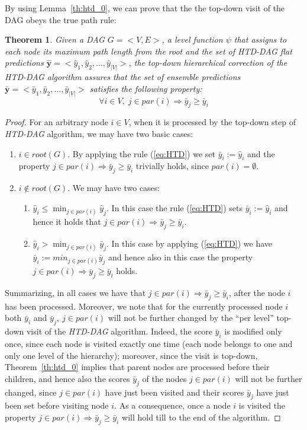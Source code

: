 \documentclass{bioinfo}
\newcommand{\by}{\boldsymbol{y}}
\newtheorem{theorem}{Theorem}
\begin{document}
By using Lemma~\ref{th:htd_0}, we can prove that the the top-down visit of the DAG obeys the true path rule:
\begin{theorem} 
Given a DAG $G = <V,E>$, a level function $\psi$ that assigns to each node its maximum path length from the root and the set of {\em HTD-DAG} flat predictions $\hat{\by} = < \hat{y}_1, \hat{y}_2, \ldots, \hat{y}_{|V|}>$, the top-down hierarchical correction of the {\em HTD-DAG} algorithm assures that the set of ensemble predictions $\bar{\by} =< \bar{y}_1, \bar{y}_2, \ldots, \bar{y}_{|V|}>$ satisfies the following property: 
\[
\forall i \in V, \;  j \in par(i) \Rightarrow \bar{y}_j \geq \bar{y}_i
\]
\label{th:htd}
\end{theorem}
\begin{proof}
For an arbitrary node $i \in V$, when it is processed by the top-down step of {\em HTD-DAG} algorithm,  we may have two basic cases:
\begin{enumerate}
\item $i \in root(G)$.
By applying the rule (\ref{eq:HTD}) we set $\bar{y}_i := \hat{y}_i$ and the property  $j \in par(i) \Rightarrow \bar{y}_j \geq \bar{y}_i$ trivially holds, since $par(i) = \emptyset$.
\item $i \notin root(G)$.
We may have two cases:
\begin{enumerate}
\item $\hat{y}_i \leq \min_{j \in par(i)} \hat{y}_j$.
In this case the rule (\ref{eq:HTD})  sets $\bar{y}_i := \hat{y}_i$ and hence it holds that $j \in par(i) \Rightarrow \bar{y}_j \geq \bar{y}_i$.
\item  $\hat{y}_i > \min_{j \in par(i)} \bar{y}_j$. 
In this case by applying (\ref{eq:HTD}) we have $\bar{y}_i := min_{j \in par(i)} \bar{y}_j$ and hence also in this case the property $j \in par(i) \Rightarrow \bar{y}_j \geq \bar{y}_i$ holds.
\end{enumerate}
\end{enumerate}
Summarizing, in all cases we have that $j \in par(i) \Rightarrow \bar{y}_j \geq \bar{y}_i$, after the node $i$ has been processed.
Moreover, we note that for the currently processed node $i$ both $\bar{y}_i$ and $\bar{y}_j,\ j \in par(i)$ will not be  further changed by the ``per level'' top-down visit of the {\em HTD-DAG} algorithm.
Indeed, the score $\bar{y}_i$ is modified only once, since each node is visited exactly one time (each node belongs to one and only one level of the hierarchy); moreover,  since the visit is top-down, Theorem~\ref{th:htd_0} implies that parent nodes are processed before their children, and hence also the scores $\bar{y}_j$ of the nodes $j \in par(i)$ will not be further changed, since $j \in par(i)$ have just been visited and their scores $\bar{y}_j$ have just been set before visiting node $i$.
As a consequence, once a node $i$ is visited  the property $j \in par(i) \Rightarrow \bar{y}_j \geq \bar{y}_i$ will hold till to the end of the algorithm. 


\end{proof}
\end{document}
